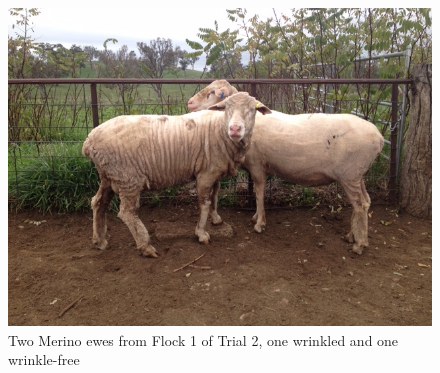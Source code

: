 %

\begin{figure}[!h]
  \centering
  \includegraphics[width=1.0\textwidth,angle=180]{IMG_0322.JPG}
  \caption{Two Merino ewes from Flock 1 of Trial 2, one wrinkled and one wrinkle-free}
  \label{fig:sheep}
\end{figure}

%

